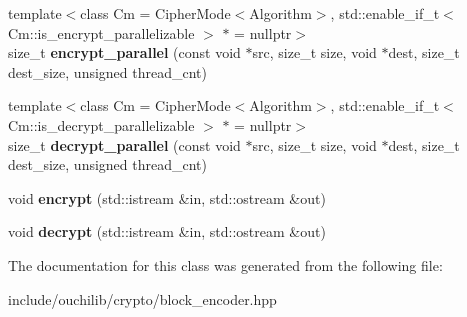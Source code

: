 \begin{DoxyCompactItemize}
{\footnotesize template$<$class Cm  = Cipher\+Mode$<$\+Algorithm$>$, std\+::enable\+\_\+if\+\_\+t$<$ Cm\+::is\+\_\+encrypt\+\_\+parallelizable $>$ $\ast$  = nullptr$>$ }\\size\+\_\+t {\bfseries encrypt\+\_\+parallel} (const void $\ast$src, size\+\_\+t size, void $\ast$dest, size\+\_\+t dest\+\_\+size, unsigned thread\+\_\+cnt)
\item 
\mbox{\label{classouchi_1_1crypto_1_1block__encoder_aa89183c9c430b437d066667e9bb22807}} 
{\footnotesize template$<$class Cm  = Cipher\+Mode$<$\+Algorithm$>$, std\+::enable\+\_\+if\+\_\+t$<$ Cm\+::is\+\_\+decrypt\+\_\+parallelizable $>$ $\ast$  = nullptr$>$ }\\size\+\_\+t {\bfseries decrypt\+\_\+parallel} (const void $\ast$src, size\+\_\+t size, void $\ast$dest, size\+\_\+t dest\+\_\+size, unsigned thread\+\_\+cnt)
\item 
\mbox{\label{classouchi_1_1crypto_1_1block__encoder_a12847cbf8836b8476d72201c64ed0d81}} 
void {\bfseries encrypt} (std\+::istream \&in, std\+::ostream \&out)
\item 
\mbox{\label{classouchi_1_1crypto_1_1block__encoder_a6c15c5b38a194ad5bd232b0f19a03c6d}} 
void {\bfseries decrypt} (std\+::istream \&in, std\+::ostream \&out)
\end{DoxyCompactItemize}


The documentation for this class was generated from the following file\+:\begin{DoxyCompactItemize}
\item 
include/ouchilib/crypto/block\+\_\+encoder.\+hpp\end{DoxyCompactItemize}
